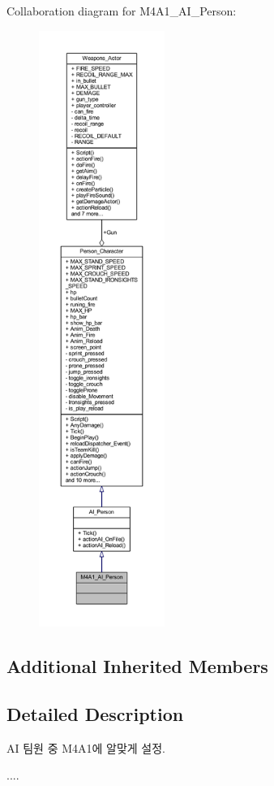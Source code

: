 Collaboration diagram for M4\+A1\+\_\+\+A\+I\+\_\+\+Person\+:
\nopagebreak
\begin{figure}[H]
\begin{center}
\leavevmode
\includegraphics[height=550pt]{class_m4_a1___a_i___person__coll__graph}
\end{center}
\end{figure}
\subsection*{Additional Inherited Members}


\subsection{Detailed Description}
AI 팀원 중 M4\+A1에 알맞게 설정. 

.... 